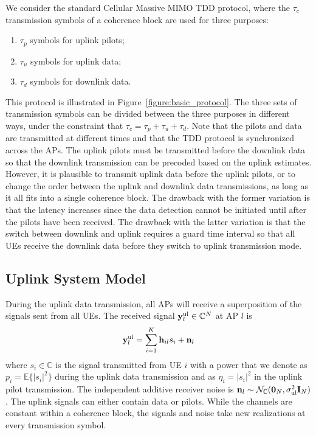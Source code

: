 We consider the standard Cellular Massive \gls{MIMO} \gls{TDD} protocol, where the $\tau_c$ transmission symbols of a coherence block are used for three purposes:
\begin{enumerate}
\item $\tau_p$ symbols for uplink pilots; 
\item $\tau_u$ symbols for uplink data; 
\item $\tau_d$ symbols for downlink data.
\end{enumerate}
This protocol is illustrated in Figure~\ref{figure:basic_protocol}. The three sets of transmission symbols can be divided between the three purposes in different ways, under the constraint that $\tau_c = \tau_p + \tau_u + \tau_d$. Note that the pilots and data are transmitted at different times and that the TDD protocol is synchronized across the APs. 
The uplink pilots must be transmitted before the downlink data so that the downlink transmission can be precoded based on the uplink estimates. However, it is plausible to transmit uplink data before the uplink pilots, or to change the order between the uplink and downlink data transmissions, as long as it all fits into a single coherence block. The drawback with the former variation is that the latency increases since the data detection cannot be initiated until after the pilots have been received. The drawback with the latter variation is that the switch between downlink and uplink requires a guard time interval so that all UEs receive the downlink data before they switch to uplink transmission mode.


\subsection{Uplink System Model}\label{sec:uplink-system-model}

During the uplink data transmission, all APs will receive a superposition of the signals sent from all UEs. The received signal ${\bf y}_{l}^{\rm{ul}} \in \mathbb {C}^{N}$ at AP $l$ is
\begin{align}\label{eq:DCC-uplink}
	{\bf y}_{l}^{\rm{ul}} = \sum\limits_{i=1}^{K} {\bf h}_{il}s_{i} + {\bf n}_{l}
\end{align}
where $s_{i} \in \mathbb{C}$ is the signal transmitted from UE $i$ with a power that we denote as $p_i = \mathbb{E} \{ |s_i|^2 \}$ during the uplink data transmission and as $\eta_i = |s_i|^2$ in the uplink pilot transmission.
The independent additive receiver noise is ${\bf n}_{l}  \sim \mathcal{N}_{\mathbb{C}}({\bf 0}_N,\sigma^2_{\mathrm{ul}}{\bf I}_{N})$. The uplink signals can either contain data or pilots. While the channels are constant within a coherence block, the signals and noise take new realizations at every transmission symbol.

